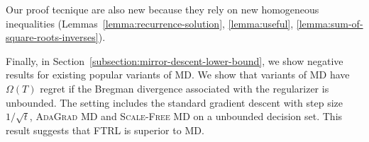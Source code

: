 Our proof tecnique are also new because they rely on new homogeneous inequalities
(Lemmas~\ref{lemma:recurrence-solution}, \ref{lemma:useful},
\ref{lemma:sum-of-square-roots-inverses}).

Finally, in Section~\ref{subsection:mirror-descent-lower-bound}, we show
negative results for existing popular variants of \textsc{MD}. We
show that variants of \textsc{MD} have $\Omega(T)$ regret if the
Bregman divergence associated with the regularizer is unbounded.
The setting includes the standard gradient descent with step size
$1/\sqrt{t}$, \textsc{AdaGrad MD} and \textsc{Scale-Free MD} on a
unbounded decision set. This result suggests that \textsc{FTRL}
is superior to \textsc{MD}.
